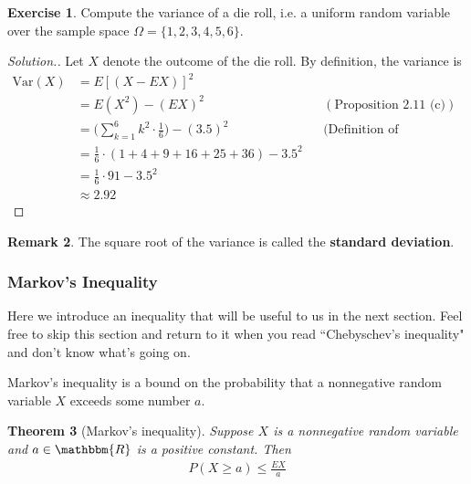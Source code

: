 \documentclass[11pt,letterpaper]{article}
\newcommand\real{\mathbbm{R}}
\newcommand\var{\text{Var}}
\newtheorem{theorem}{Theorem}
\numberwithin{theorem}{section}
\numberwithin{definition}{section}
\numberwithin{lemma}{section}
\numberwithin{corollary}{section}
\numberwithin{proposition}{section}
\theoremstyle{definition}
\newtheorem{remark}[theorem]{Remark}
\numberwithin{remark}{section}
\numberwithin{claim}{section}
\numberwithin{observation}{section}
\numberwithin{fact}{section}
\numberwithin{assumption}{section}
\numberwithin{example}{section}
\newtheorem{exercise}[theorem]{Exercise}
\numberwithin{exercise}{section}
\begin{document}
\begin{exercise}
Compute the variance of a die roll, i.e. a uniform random variable over the sample space $\Omega =\{1,2,3,4,5,6\}$.
\end{exercise}
\begin{proof}[Solution.]
Let $X$ denote the outcome of the die roll. By definition, the variance is
\begin{align*}
\var(X) &= E[(X-EX)]^2 \\
&= E(X^2) - (EX)^2 &&(\text{Proposition 2.11 (c)}) \\ 
&= \Big(\sum_{k=1}^6 k^2 \cdot \frac{1}{6} \Big) - (3.5)^2 &&\text{(Definition of Expectation)} \\
&= \frac{1}{6} \cdot (1 + 4 + 9 + 16 + 25 + 36) - 3.5^2 \\
&= \frac{1}{6} \cdot 91 - 3.5^2 \\
&\approx 2.92
\end{align*}

\end{proof}

\begin{remark} The square root of the variance is called the \textbf{standard deviation}.
\end{remark}

\subsubsection{Markov's Inequality}
Here we introduce an inequality that will be useful to us in the next section. Feel free to skip this section and return to it when you read ``Chebyschev's inequality" and don't know what's going on.

Markov's inequality is a bound on the probability that a nonnegative random variable $X$ exceeds some number $a$. 

\begin{theorem}[Markov's inequality]
Suppose $X$ is a nonnegative random variable and $a \in \real$ is a positive constant. Then
\begin{align*}
P(X \geq a) \leq \frac{EX}{a}
\end{align*}
\end{theorem}
\end{document}
